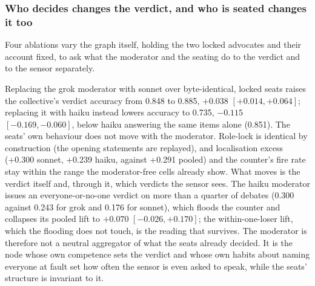 \subsubsection{Who decides changes the verdict, and who is seated changes it too}
\label{sec-results-decider}

Four ablations vary the graph itself, holding the two locked advocates and
their account fixed, to ask what the moderator and the seating do to the
verdict and to the sensor separately.

Replacing the grok moderator with sonnet over byte-identical, locked seats
raises the collective's verdict accuracy from 0.848 to 0.885,
$+0.038$ $[+0.014, +0.064]$; replacing it with haiku instead lowers accuracy
to 0.735, $-0.115$ $[-0.169, -0.060]$, below haiku answering the same items
alone (0.851).
The seats' own behaviour does not move with the moderator. Role-lock is
identical by construction (the opening statements are replayed), and
localisation excess (+0.300 sonnet, +0.239 haiku, against +0.291 pooled) and
the counter's fire rate stay within the range the moderator-free cells
already show. What moves is the verdict itself and, through it, which
verdicts the sensor sees. The haiku moderator issues an everyone-or-no-one
verdict on more than a quarter of debates (0.300 against 0.243 for grok and
0.176 for sonnet), which floods the counter and collapses its pooled lift
to $+0.070$ $[-0.026, +0.170]$; the within-one-loser lift, which the
flooding does not touch, is the reading that survives. The moderator is
therefore not a neutral aggregator of what the seats already decided. It is
the node whose own competence sets the verdict and whose own habits about
naming everyone at fault set how often the sensor is even asked to speak,
while the seats' structure is invariant to it.

